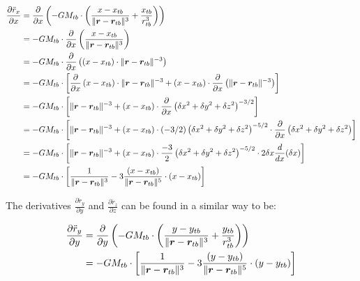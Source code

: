 \begin{equation}\label{eq:thirdbodyaccelerationgradx}
  \begin{aligned}
  \frac{\partial \ddot{r}_x}{\partial x} 
    &= \frac{\partial}{\partial x}\left( -GM_{tb} \cdot \left( \frac{x - x_{tb}}{\lVert\bm{r}-\bm{r}_{tb}\rVert^3} + \frac{x_{tb}}{r_{tb}^3} \right) \right) \\
    &= -GM_{tb} \cdot \frac{\partial}{\partial x} \left( \frac{x - x_{tb}}{\lVert\bm{r}-\bm{r}_{tb}\rVert^3} \right) \\
    &= -GM_{tb} \cdot \frac{\partial}{\partial x} \left( \left(x - x_{tb}\right) \cdot \lVert\bm{r}-\bm{r}_{tb}\rVert^{-3} \right) \\
    &= -GM_{tb} \cdot \left[ \frac{\partial}{\partial x} \left(x - x_{tb}\right) \cdot \lVert\bm{r}-\bm{r}_{tb}\rVert^{-3}
     + \left(x - x_{tb}\right) \cdot \frac{\partial}{\partial x} \left( \lVert\bm{r}-\bm{r}_{tb}\rVert^{-3} \right) \right] \\
    &= -GM_{tb} \cdot \left[ \lVert\bm{r}-\bm{r}_{tb}\rVert^{-3} + \left(x - x_{tb}\right) \cdot \frac{\partial}{\partial x} \left( \delta x^2 + \delta y^2 + \delta z^2 \right)^{-3/2} \right] \\
    &= -GM_{tb} \cdot \left[ \lVert\bm{r}-\bm{r}_{tb}\rVert^{-3} + \left(x - x_{tb}\right) \cdot (-3/2) \left( \delta x^2 + \delta y^2 + \delta z^2 \right)^{-5/2} 
      \cdot \frac{\partial}{\partial x} \left( \delta x^2 + \delta y^2 + \delta z^2 \right) \right] \\
    &= -GM_{tb} \cdot \left[ \lVert\bm{r}-\bm{r}_{tb}\rVert^{-3} + \left(x - x_{tb}\right) \cdot \frac{-3}{2} \left( \delta x^2 + \delta y^2 + \delta z^2 \right)^{-5/2} \cdot 2 \delta x \frac{d}{dx} (\delta x) \right] \\
    &= -GM_{tb} \cdot \left[ \frac{1}{\lVert\bm{r}-\bm{r}_{tb}\rVert^{3}} - 3 \frac{\left(x - x_{tb}\right)}{\lVert\bm{r}-\bm{r}_{tb}\rVert^{5}} \cdot \left(x - x_{tb}\right) \right] \\
  \end{aligned}
\end{equation}

The derivatives $\frac{\partial \ddot{r}_y}{\partial y}$ and $\frac{\partial \ddot{r}_z}{\partial z}$ 
can be found in a similar way to be:

\begin{equation}\label{eq:thirdbodyaccelerationgrady}
  \begin{aligned}
  \frac{\partial \ddot{r}_y}{\partial y} &= \frac{\partial}{\partial y}\left( -GM_{tb} \cdot \left( \frac{y - y_{tb}}{\lVert\bm{r}-\bm{r}_{tb}\rVert^3} + \frac{y_{tb}}{r_{tb}^3} \right) \right) \\
    &= -GM_{tb} \cdot \left[ \frac{1}{\lVert\bm{r}-\bm{r}_{tb}\rVert^{3}} - 3 \frac{\left(y - y_{tb}\right)}{\lVert\bm{r}-\bm{r}_{tb}\rVert^{5}} \cdot \left(y - y_{tb}\right) \right]
  \end{aligned}
\end{equation}

